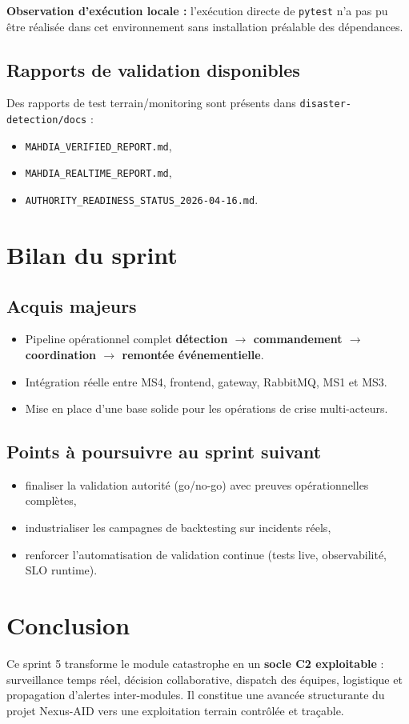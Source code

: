 \textbf{Observation d'ex\'ecution locale :} l'ex\'ecution directe de \texttt{pytest} n'a pas pu \^etre r\'ealis\'ee dans cet environnement sans installation pr\'ealable des d\'ependances.

\subsection{Rapports de validation disponibles}
Des rapports de test terrain/monitoring sont pr\'esents dans \texttt{disaster-detection/docs} :
\begin{itemize}
    \item \texttt{MAHDIA\_VERIFIED\_REPORT.md},
    \item \texttt{MAHDIA\_REALTIME\_REPORT.md},
    \item \texttt{AUTHORITY\_READINESS\_STATUS\_2026-04-16.md}.
\end{itemize}

\section{Bilan du sprint}
\subsection{Acquis majeurs}
\begin{itemize}
    \item Pipeline op\'erationnel complet \textbf{d\'etection \(\rightarrow\) commandement \(\rightarrow\) coordination \(\rightarrow\) remont\'ee \'ev\'enementielle}.
    \item Int\'egration r\'eelle entre MS4, frontend, gateway, RabbitMQ, MS1 et MS3.
    \item Mise en place d'une base solide pour les op\'erations de crise multi-acteurs.
\end{itemize}

\subsection{Points \`a poursuivre au sprint suivant}
\begin{itemize}
    \item finaliser la validation autorit\'e (go/no-go) avec preuves op\'erationnelles compl\`etes,
    \item industrialiser les campagnes de backtesting sur incidents r\'eels,
    \item renforcer l'automatisation de validation continue (tests live, observabilit\'e, SLO runtime).
\end{itemize}

\section{Conclusion}
Ce sprint 5 transforme le module catastrophe en un \textbf{socle C2 exploitable} : surveillance temps r\'eel, d\'ecision collaborative, dispatch des \'equipes, logistique et propagation d'alertes inter-modules. Il constitue une avanc\'ee structurante du projet Nexus-AID vers une exploitation terrain contr\^ol\'ee et tra\c{c}able.
